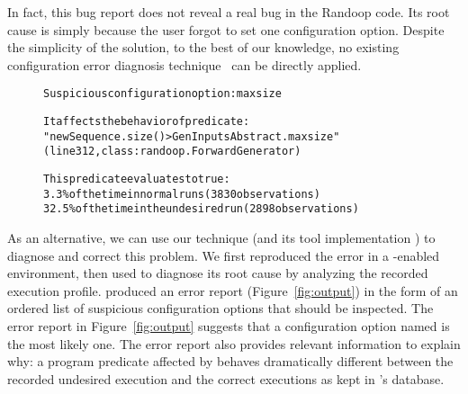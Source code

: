 
In fact, this bug report does not reveal a real bug
in the Randoop code. Its root cause is simply because
the user forgot to set one configuration option.
Despite the simplicity of the solution, to the best of our knowledge, no
existing configuration error diagnosis technique~\cite{Attariyan:2008:UCD, 
Yuan:2011:COC, Su:2009:AGP, Whitaker:2004:CDS, Wang:2004:AMT,
Attariyan:2010:ACT, Rabkin:2011:PPC} can be directly applied.




\begin{figure}[t]
\begin{CodeOut}
\begin{alltt} 
Suspicious configuration option: maxsize

It affects the behavior of predicate:
"newSequence.size() > GenInputsAbstract.maxsize"
(line 312, class: randoop.ForwardGenerator) 

This predicate evaluates to true:
  3.3\% of the time in normal runs (3830 observations)
  32.5\% of the time in the undesired run (2898 observations)

\end{alltt}
\end{CodeOut}
\vspace*{-15pt}
\end{figure}

As an alternative, we can use our technique (and its tool implementation \ourtool)
to diagnose and correct this problem. We first reproduced the
error in a \ourtool-enabled environment, then used \ourtool
to diagnose its root cause by analyzing the recorded execution profile.
\ourtool produced
an error report (Figure~\ref{fig:output}) in the form of an ordered list of
suspicious configuration options that should be inspected.
The error report in Figure~\ref{fig:output} suggests that
a configuration option named
 is the most likely one.
The error report also provides relevant 
information to explain why: %
a program predicate affected by  behaves dramatically
different between the recorded undesired execution
and the correct executions as kept in \ourtool's database.


